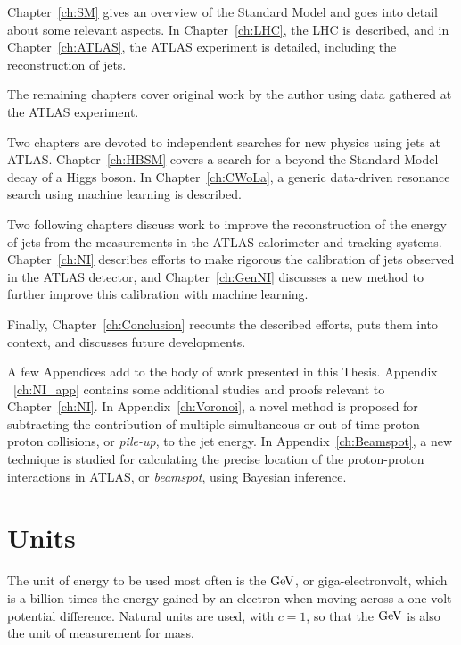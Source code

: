 Chapter~\ref{ch:SM} gives an overview of the Standard Model and goes into detail about some relevant aspects.
In Chapter~\ref{ch:LHC}, the LHC is described, and in Chapter~\ref{ch:ATLAS}, the ATLAS experiment is detailed, including the reconstruction of jets.

The remaining chapters cover original work by the author using data gathered at the ATLAS experiment.

Two chapters are devoted to independent searches for new physics using jets at ATLAS.
Chapter~\ref{ch:HBSM} covers a search for a beyond-the-Standard-Model decay of a Higgs boson.
In Chapter~\ref{ch:CWoLa}, a generic data-driven resonance search using machine learning is described.

Two following chapters discuss work to improve the reconstruction of the energy of jets from the measurements in the ATLAS calorimeter and tracking systems.
Chapter~\ref{ch:NI} describes efforts to make rigorous the calibration of jets observed in the ATLAS detector, and Chapter~\ref{ch:GenNI} discusses a new method to further improve this calibration with machine learning.

Finally, Chapter~\ref{ch:Conclusion} recounts the described efforts, puts them into context, and discusses future developments.

A few Appendices add to the body of work presented in this Thesis.
Appendix ~\ref{ch:NI_app} contains some additional studies and proofs relevant to Chapter~\ref{ch:NI}.
In Appendix~\ref{ch:Voronoi}, a novel method is proposed for subtracting the contribution of multiple simultaneous or out-of-time proton-proton collisions, or \textit{pile-up}, to the jet energy.
In Appendix~\ref{ch:Beamspot}, a new technique is studied for calculating the precise location of the proton-proton interactions in ATLAS, or \textit{beamspot}, using Bayesian inference.

\section{Units}
The unit of energy to be used most often is the $\mathrm{GeV}$, or giga-electronvolt, which is a billion times the energy gained by an electron when moving across a one volt potential difference.
Natural units are used, with $c=1$, so that the $\mathrm{GeV}$ is also the unit of measurement for mass.

